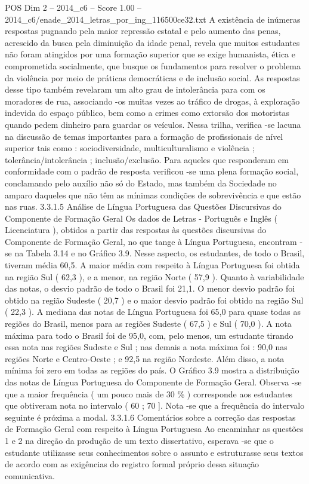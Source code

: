 \begin{textsample}{POS Dim 2 – 2014\_c6 – Score 1.00 – 2014\_c6/enade\_2014\_letras\_por\_ing\_116500ce32.txt}
A existência de inúmeras respostas pugnando pela maior repressão estatal e pelo aumento das penas, acrescido da busca pela diminuição da idade penal, revela que muitos estudantes não foram atingidos por uma formação superior que se exige humanista, ética e comprometida socialmente, que busque os fundamentos para resolver o problema da violência por meio de práticas democráticas e de inclusão social.
As respostas desse tipo também revelaram um alto grau de intolerância para com os moradores de rua, associando -os muitas vezes ao tráfico de drogas, à exploração indevida do espaço público, bem como a crimes como extorsão dos motoristas quando pedem dinheiro para guardar os veículos.
Nessa trilha, verifica -se lacuna na discussão de temas importantes para a formação de profissionais de nível superior tais como : sociodiversidade, multiculturalismo e violência ; tolerância/intolerância ; inclusão/exclusão.
Para aqueles que responderam em conformidade com o padrão de resposta verificou -se uma plena formação social, conclamando pelo auxílio não só do Estado, mas também da Sociedade no amparo daqueles que não têm as mínimas condições de sobrevivência e que estão nas ruas. 3.3.1.5 Análise de Língua Portuguesa das Questões Discursivas do Componente de Formação Geral Os dados de Letras - Português e Inglês ( Licenciatura ), obtidos a partir das respostas às questões discursivas do Componente de Formação Geral, no que tange à Língua Portuguesa, encontram -se na Tabela 3.14 e no Gráfico 3.9.
Nesse aspecto, os estudantes, de todo o Brasil, tiveram média 60,5.
A maior média com respeito à Língua Portuguesa foi obtida na região Sul ( 62,3 ), e a menor, na região Norte ( 57,9 ).
Quanto à variabilidade das notas, o desvio padrão de todo o Brasil foi 21,1.
O menor desvio padrão foi obtido na região Sudeste ( 20,7 ) e o maior desvio padrão foi obtido na região Sul ( 22,3 ).
A mediana das notas de Língua Portuguesa foi 65,0 para quase todas as regiões do Brasil, menos para as regiões Sudeste ( 67,5 ) e Sul ( 70,0 ).
A nota máxima para todo o Brasil foi de 95,0, com, pelo menos, um estudante tirando essa nota nas regiões Sudeste e Sul ; nas demais a nota máxima foi : 90,0 nas regiões Norte e Centro-Oeste ; e 92,5 na região Nordeste.
Além disso, a nota mínima foi zero em todas as regiões do país.
O Gráfico 3.9 mostra a distribuição das notas de Língua Portuguesa do Componente de Formação Geral.
Observa -se que a maior frequência ( um pouco mais de 30 \% ) corresponde aos estudantes que obtiveram nota no intervalo ( 60 ; 70 ].
Nota -se que a frequência do intervalo seguinte é próxima a modal. 3.3.1.6 Comentários sobre a correção das respostas de Formação Geral com respeito à Língua Portuguesa Ao encaminhar as questões 1 e 2 na direção da produção de um texto dissertativo, esperava -se que o estudante utilizasse seus conhecimentos sobre o assunto e estruturasse seus textos de acordo com as exigências do registro formal próprio dessa situação comunicativa.

\end{textsample}
